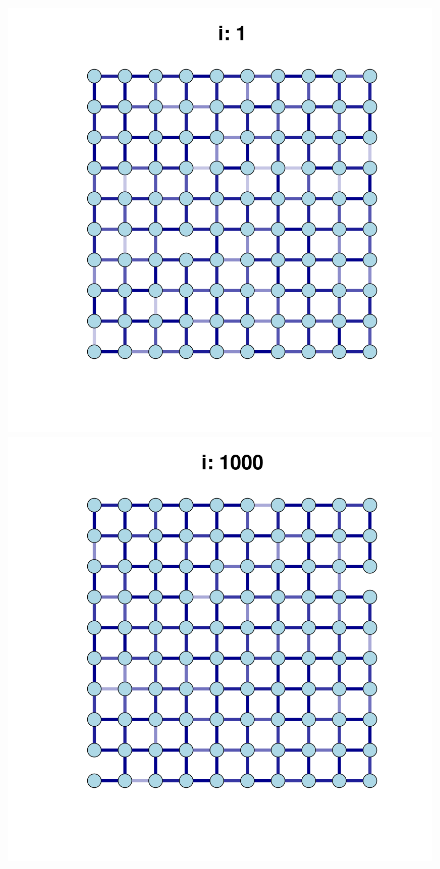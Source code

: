 \begin{figure}[h]
    \centering
    \begin{minipage}{0.25\textwidth}
        \centering
        \includegraphics[width=\textwidth]{images/task30/dyn1.png}
    \end{minipage}\hfill
    \begin{minipage}{0.25\textwidth}
        \centering
        \includegraphics[width=\textwidth]{images/task30/dyn2.png}

\end{minipage}
\end{figure}
